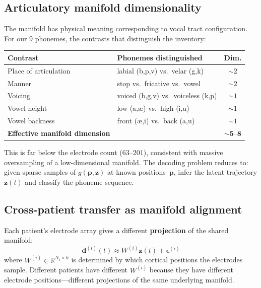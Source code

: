 \documentclass[11pt,letterpaper]{article}
\newcommand{\bfp}{\mathbf{p}}
\newcommand{\bfz}{\mathbf{z}}
\newcommand{\bfd}{\mathbf{d}}
\newcommand{\R}{\mathbb{R}}
\begin{document}
\subsection{Articulatory manifold dimensionality}

The manifold has physical meaning corresponding to vocal tract configuration. For our 9 phonemes, the contrasts that distinguish the inventory:

\begin{table}[h]
\centering\small
\begin{tabular}{@{}llc@{}}
\toprule
\textbf{Contrast} & \textbf{Phonemes distinguished} & \textbf{Dim.} \\
\midrule
Place of articulation & labial (b,p,v) vs.\ velar (g,k) & ${\sim}2$ \\
Manner & stop vs.\ fricative vs.\ vowel & ${\sim}2$ \\
Voicing & voiced (b,g,v) vs.\ voiceless (k,p) & ${\sim}1$ \\
Vowel height & low (a,\ae) vs.\ high (i,u) & ${\sim}1$ \\
Vowel backness & front (\ae,i) vs.\ back (a,u) & ${\sim}1$ \\
\midrule
\textbf{Effective manifold dimension} & & $\mathbf{{\sim}5\text{--}8}$ \\
\bottomrule
\end{tabular}
\end{table}

\noindent This is far below the electrode count (63--201), consistent with massive oversampling of a low-dimensional manifold. The decoding problem reduces to: given sparse samples of $g(\bfp, \bfz)$ at known positions~$\bfp$, infer the latent trajectory $\bfz(t)$ and classify the phoneme sequence.

\subsection{Cross-patient transfer as manifold alignment}

Each patient's electrode array gives a different \textbf{projection} of the shared manifold:
\begin{equation}\label{eq:projection}
\bfd^{(i)}(t) \approx W^{(i)} \bfz(t) + \boldsymbol{\epsilon}^{(i)}
\end{equation}
where $W^{(i)} \in \R^{N_i \times k}$ is determined by which cortical positions the electrodes sample. Different patients have different $W^{(i)}$ because they have different electrode positions---different projections of the same underlying manifold.
\end{document}
